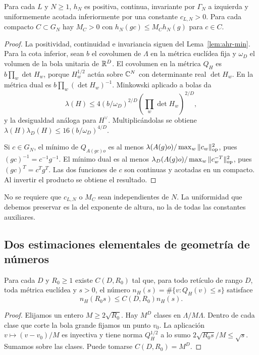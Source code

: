 \begin{proposicion}
\label{prop:ahr-ht}
Para cada $L$ y $N\ge1$, $h_N$ es positiva, continua, invariante por $\Gamma_N$ a izquierda y uniformemente acotada inferiormente por una constante $c_{L,N}>0$. Para cada compacto $C\subset G_N$ hay $M_C>0$ con $h_N(gc)\le M_C h_N(g)$ para $c\in C$.
\end{proposicion}
\begin{proof}
La positividad, continuidad e invariancia siguen del Lema~\ref{lem:ahr-min}. Para la cota inferior, sean $b$ el covolumen de $\Lambda$ en la métrica euclídea fija y $\omega_D$ el volumen de la bola unitaria de $\mathbb{R}^D$. El covolumen en la métrica $Q_H$ es $b\prod_w\det H_w$, porque $H_w^{1/2}$ actúa sobre $\mathbb{C}^N$ con determinante real $\det H_w$. En la métrica dual es $b\prod_w(\det H_w)^{-1}$. Minkowski aplicado a bolas da
\[
 \lambda(H)\le 4(b/\omega_D)^{2/D}
                       (\prod_w\det H_w)^{2/D},
\]
y la desigualdad análoga para $H^\vee$. Multiplicándolas se obtiene $\lambda(H)\lambda_D(H)\le16(b/\omega_D)^{4/D}$.

Si $c\in G_N$, el mínimo de $Q_{A(gc)o}$ es al menos $\lambda(A(g)o)/\max_w\|c_w\|_{\rm op}^2$, pues $(gc)^{-1}=c^{-1}g^{-1}$. El mínimo dual es al menos $\lambda_D(A(g)o)/\max_w\|c_w^{-T}\|_{\rm op}^2$, pues $(gc)^T=c^Tg^T$. Las dos funciones de $c$ son continuas y acotadas en un compacto. Al invertir el producto se obtiene el resultado.
\end{proof}

No se requiere que $c_{L,N}$ o $M_C$ sean independientes de $N$. La uniformidad que debemos preservar es la del exponente de altura, no la de todas las constantes auxiliares.

\subsection{Dos estimaciones elementales de geometría de números}

\begin{lema}
\label{lem:ahr-count}
Para cada $D$ y $R_0\ge1$ existe $C(D,R_0)$ tal que, para todo retículo de rango $D$, toda métrica euclídea y $s>0$, el número $n_H(s)=\#\{v:Q_H(v)\le s\}$ satisface
\begin{equation}
 n_H(R_0s)\le C(D,R_0)n_H(s).
 \label{eq:ahr-count}
\end{equation}
\end{lema}
\begin{proof}
Elijamos un entero $M\ge2\sqrt{R_0}$. Hay $M^D$ clases en $\Lambda/M\Lambda$. Dentro de cada clase que corte la bola grande fijamos un punto $v_0$. La aplicación $v\mapsto(v-v_0)/M$ es inyectiva y tiene norma $Q_H^{1/2}$ a lo sumo $2\sqrt{R_0s}/M\le\sqrt{s}$. Sumamos sobre las clases. Puede tomarse $C(D,R_0)=M^D$.
\end{proof}

